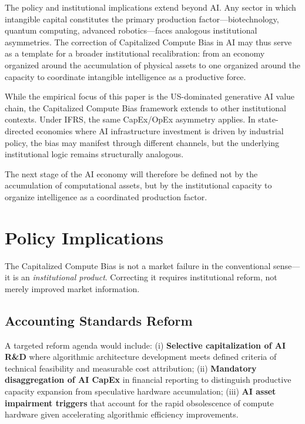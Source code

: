 \documentclass[11pt,letterpaper]{article}
\begin{document}
The policy and institutional implications extend beyond AI. Any sector in which intangible capital constitutes the primary production factor---biotechnology, quantum computing, advanced robotics---faces analogous institutional asymmetries. The correction of Capitalized Compute Bias in AI may thus serve as a template for a broader institutional recalibration: from an economy organized around the accumulation of physical assets to one organized around the capacity to coordinate intangible intelligence as a productive force.

While the empirical focus of this paper is the US-dominated generative AI value chain, the Capitalized Compute Bias framework extends to other institutional contexts. Under IFRS, the same CapEx/OpEx asymmetry applies. In state-directed economies where AI infrastructure investment is driven by industrial policy, the bias may manifest through different channels, but the underlying institutional logic remains structurally analogous.

The next stage of the AI economy will therefore be defined not by the accumulation of computational assets, but by the institutional capacity to organize intelligence as a coordinated production factor.

\section{Policy Implications}

The Capitalized Compute Bias is not a market failure in the conventional sense---it is an \textit{institutional product}. Correcting it requires institutional reform, not merely improved market information.

\subsection{Accounting Standards Reform}

A targeted reform agenda would include: (i) \textbf{Selective capitalization of AI R\&D} where algorithmic architecture development meets defined criteria of technical feasibility and measurable cost attribution; (ii) \textbf{Mandatory disaggregation of AI CapEx} in financial reporting to distinguish productive capacity expansion from speculative hardware accumulation; (iii) \textbf{AI asset impairment triggers} that account for the rapid obsolescence of compute hardware given accelerating algorithmic efficiency improvements.
\end{document}
